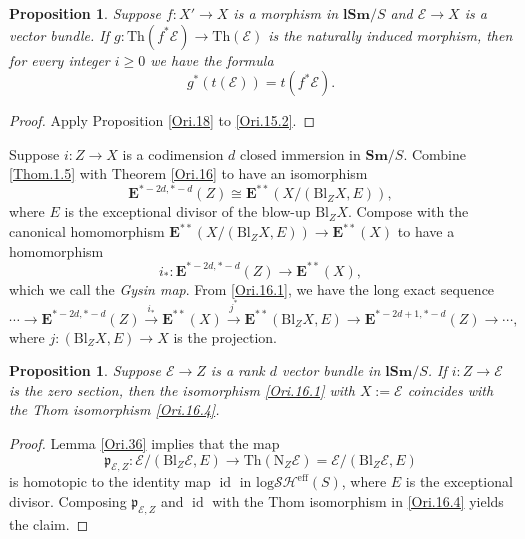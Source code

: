 \documentclass[11pt, a4paper]{amsart}
\newtheorem{prop}[thm]{Proposition}
\theoremstyle{definition}
\numberwithin{equation}{subsection}
\newcommand{\Sm}{\mathbf{Sm}}
\newcommand{\lSm}{\mathbf{lSm}}
\newcommand{\id}{\operatorname{id}}   			%
\newcommand{\Blow}{{\mathrm{Bl}}}
\newcommand{\Normal}{{\mathrm{N}}}
\newcommand{\Thom}{\mathrm{Th}}
\newcommand{\cE}{\mathcal{E}}
\newcommand{\ringE}{\mathbf{E}}
\newcommand{\inflogSHS}{\mathrm{log}\mathcal{SH}^{\mathrm{eff}}}
\begin{document}
\begin{prop}
\label{Ori.33}
Suppose $f\colon X'\to X$ is a morphism in $\lSm/S$ and $\cE\to X$ is a vector bundle.
If $g\colon \Thom(f^*\cE)\to \Thom(\cE)$ is the naturally induced morphism, 
then for every integer $i\geq 0$ we have the formula 
\[
g^*(t(\cE))=t(f^*\cE).
\]
\end{prop}
\begin{proof}
Apply Proposition \ref{Ori.18} to \eqref{Ori.15.2}.
\end{proof}






Suppose $i\colon Z\to X$ is a codimension $d$ closed immersion in $\Sm/S$.
Combine \eqref{Thom.1.5} with Theorem \ref{Ori.16} to have an isomorphism
\begin{equation}
\label{Ori.16.1}
\ringE^{*-2d,*-d}(Z)
\cong
\ringE^{**}(X/(\Blow_Z X,E)),
\end{equation}
where $E$ is the exceptional divisor of the blow-up $\Blow_Z X$.
Compose with the canonical homomorphism $\ringE^{**}(X/(\Blow_Z X,E))\to \ringE^{**}(X)$ to have a homomorphism
\begin{equation}
\label{Ori.16.2}
i_*\colon \ringE^{*-2d,*-d}(Z)\to \ringE^{**}(X),
\end{equation}
which we call the \emph{Gysin map}. 
From \eqref{Ori.16.1}, we have the long exact sequence
\begin{equation}
\label{Ori.16.3}
\cdots
\to
\ringE^{*-2d,*-d}(Z)
\xrightarrow{i_*}
\ringE^{**}(X)
\xrightarrow{j^*}
\ringE^{**}(\Blow_Z X,E)
\to
\ringE^{*-2d+1,*-d}(Z)
\to
\cdots,
\end{equation}
where $j\colon (\Blow_Z X,E)\to X$ is the projection.

\begin{prop}
\label{Ori.63}
Suppose $\cE\to Z$ is a rank $d$ vector bundle in $\lSm/S$.
If $i\colon Z\to \cE$ is the zero section, then the isomorphism \eqref{Ori.16.1} with $X:=\cE$ coincides with the Thom isomorphism \eqref{Ori.16.4}.
\end{prop}
\begin{proof}
Lemma \ref{Ori.36} implies that the map
\[
\mathfrak{p}_{\cE,Z}
\colon
\cE/(\Blow_Z \cE,E)\to \Thom(\Normal_Z \cE) = \cE/(\Blow_Z \cE,E)
\]
is homotopic to the identity map $\id$ in $\inflogSHS(S)$, where $E$ is the exceptional divisor.
Composing $\mathfrak{p}_{\cE,Z}$ and $\id$ with the Thom isomorphism in \eqref{Ori.16.4} 
yields the claim.
\end{proof}
\end{document}
